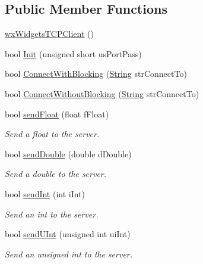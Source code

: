 \subsection*{Public Member Functions}
\begin{DoxyCompactItemize}
\item 
\hyperlink{class_rad_j_a_v_1_1_networking_1_1wx_widgets_t_c_p_client_af80442d38749a9cd12a45ef7d8f7928c}{wx\+Widgets\+T\+C\+P\+Client} ()
\item 
bool \hyperlink{class_rad_j_a_v_1_1_networking_1_1wx_widgets_t_c_p_client_aee6ffb935babab8f984e3edd6ab100cd}{Init} (unsigned short us\+Port\+Pass)
\item 
bool \hyperlink{class_rad_j_a_v_1_1_networking_1_1wx_widgets_t_c_p_client_a92d5158fc70110d7c152d32382418640}{Connect\+With\+Blocking} (\hyperlink{class_rad_j_a_v_1_1_string}{String} str\+Connect\+To)
\item 
bool \hyperlink{class_rad_j_a_v_1_1_networking_1_1wx_widgets_t_c_p_client_a2aebbf48ef53705babf0f4914cc8e23e}{Connect\+Without\+Blocking} (\hyperlink{class_rad_j_a_v_1_1_string}{String} str\+Connect\+To)
\item 
bool \hyperlink{class_rad_j_a_v_1_1_networking_1_1wx_widgets_t_c_p_client_ad683dafeb275ab9b1dd60bcd1f177107}{send\+Float} (float f\+Float)
\begin{DoxyCompactList}\small\item\em Send a float to the server. \end{DoxyCompactList}\item 
bool \hyperlink{class_rad_j_a_v_1_1_networking_1_1wx_widgets_t_c_p_client_afb57ef92f150833532015d14475a5ae1}{send\+Double} (double d\+Double)
\begin{DoxyCompactList}\small\item\em Send a double to the server. \end{DoxyCompactList}\item 
bool \hyperlink{class_rad_j_a_v_1_1_networking_1_1wx_widgets_t_c_p_client_a8463c6778160ef13bfd87dac47676614}{send\+Int} (int i\+Int)
\begin{DoxyCompactList}\small\item\em Send an int to the server. \end{DoxyCompactList}\item 
bool \hyperlink{class_rad_j_a_v_1_1_networking_1_1wx_widgets_t_c_p_client_a4dd19f4c7b18c6599972f238f6021580}{send\+U\+Int} (unsigned int ui\+Int)
\begin{DoxyCompactList}\small\item\em Send an unsigned int to the server. \end{DoxyCompactList}\item 

\end{DoxyCompactItemize}
